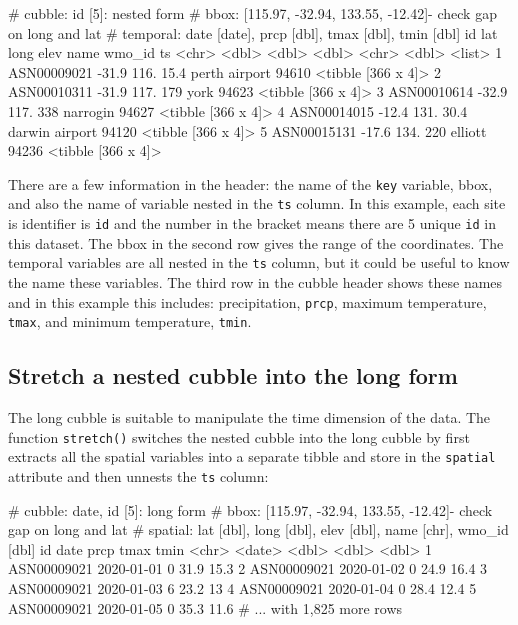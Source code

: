 \documentclass[
]{jss}
\begin{document}
\begin{CodeChunk}
\begin{CodeOutput}
# cubble:   id [5]: nested form
# bbox:     [115.97, -32.94, 133.55, -12.42]- check gap on long and lat
# temporal: date [date], prcp [dbl], tmax [dbl], tmin [dbl]
  id            lat  long  elev name           wmo_id ts                
  <chr>       <dbl> <dbl> <dbl> <chr>           <dbl> <list>            
1 ASN00009021 -31.9  116.  15.4 perth airport   94610 <tibble [366 x 4]>
2 ASN00010311 -31.9  117. 179   york            94623 <tibble [366 x 4]>
3 ASN00010614 -32.9  117. 338   narrogin        94627 <tibble [366 x 4]>
4 ASN00014015 -12.4  131.  30.4 darwin airport  94120 <tibble [366 x 4]>
5 ASN00015131 -17.6  134. 220   elliott         94236 <tibble [366 x 4]>
\end{CodeOutput}
\end{CodeChunk}

There are a few information in the  header: the name of the
\texttt{key} variable, bbox, and also the name of variable nested in the
\texttt{ts} column. In this example, each site is identifier is
\texttt{id} and the number in the bracket means there are 5 unique
\texttt{id} in this dataset. The bbox in the second row gives the range
of the coordinates. The temporal variables are all nested in the
\texttt{ts} column, but it could be useful to know the name these
variables. The third row in the cubble header shows these names and in
this example this includes: precipitation, \texttt{prcp}, maximum
temperature, \texttt{tmax}, and minimum temperature, \texttt{tmin}.

\hypertarget{stretch-a-nested-cubble-into-the-long-form}{%
\subsection{Stretch a nested cubble into the long
form}\label{stretch-a-nested-cubble-into-the-long-form}}

The long cubble is suitable to manipulate the time dimension of the
data. The function \texttt{stretch()} switches the nested cubble into
the long cubble by first extracts all the spatial variables into a
separate tibble and store in the \texttt{spatial} attribute and then
unnests the \texttt{ts} column:

\begin{CodeChunk}
\begin{CodeOutput}
# cubble:  date, id [5]: long form
# bbox:    [115.97, -32.94, 133.55, -12.42]- check gap on long and lat
# spatial: lat [dbl], long [dbl], elev [dbl], name [chr], wmo_id [dbl]
  id          date        prcp  tmax  tmin
  <chr>       <date>     <dbl> <dbl> <dbl>
1 ASN00009021 2020-01-01     0  31.9  15.3
2 ASN00009021 2020-01-02     0  24.9  16.4
3 ASN00009021 2020-01-03     6  23.2  13  
4 ASN00009021 2020-01-04     0  28.4  12.4
5 ASN00009021 2020-01-05     0  35.3  11.6
# ... with 1,825 more rows
\end{CodeOutput}
\end{CodeChunk}
\end{document}
